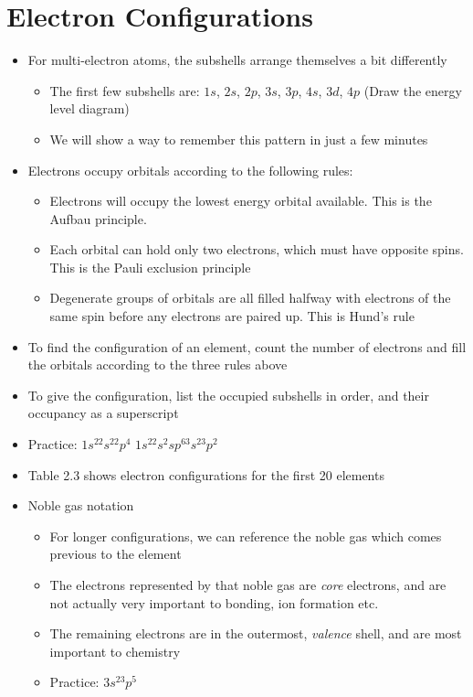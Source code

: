 \documentclass[12pt, openany, letterpaper]{memoir}
\begin{document}
\section{Electron Configurations}
\begin{itemize}
	\item For multi-electron atoms, the subshells arrange themselves a bit differently
	      \begin{itemize}
		      \item The first few subshells are: $1s$, $2s$, $2p$, $3s$, $3p$, $4s$, $3d$, $4p$ (Draw the energy level diagram)
		      \item We will show a way to remember this pattern in just a few minutes
	      \end{itemize}
	\item Electrons occupy orbitals according to the following rules:
	      \begin{itemize}
		      \item Electrons will occupy the lowest energy orbital available. This is the Aufbau principle.
		      \item Each orbital can hold only two electrons, which must have opposite spins. This is the Pauli exclusion principle
		      \item Degenerate groups of orbitals are all filled halfway with electrons of the same spin before any electrons are paired up. This is Hund's rule
	      \end{itemize}
	\item To find the configuration of an element, count the number of electrons and fill the orbitals according to the three rules above
	\item To give the configuration, list the occupied subshells in order, and their occupancy as a superscript
	\item Practice: $1s^22s^22p^4$ \hspace{2em} $1s^22s^2sp^63s^23p^2$
	\item Table 2.3 shows electron configurations for the first 20 elements
	\item Noble gas notation
	      \begin{itemize}
		      \item For longer configurations, we can reference the noble gas which comes previous to the element
		      \item The electrons represented by that noble gas are \emph{core} electrons, and are not actually very important to bonding, ion formation etc.
		      \item The remaining electrons are in the outermost, \emph{valence} shell, and are most important to chemistry
		      \item Practice: $3s^23p^5$
	      \end{itemize}
\end{itemize}
\end{document}
